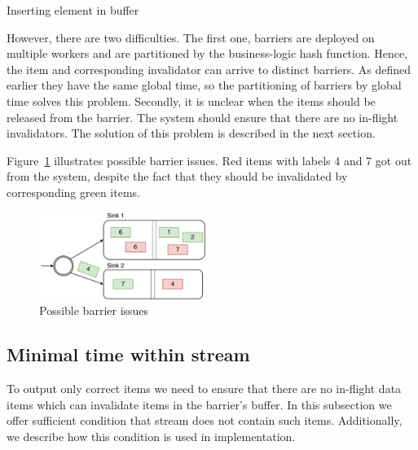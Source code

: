 \begin{algorithm}
\caption{Inserting element in buffer}
\label{buffer-insert}
\begin{algorithmic}
        \State {}
      \EndIf
    \EndFor
    \State {}
  \EndFunction
\end{algorithmic}
\end{algorithm}

However, there are two difficulties. The first one, barriers are deployed on multiple workers and are partitioned by the business-logic hash function. Hence, the item and corresponding invalidator can arrive to distinct barriers. As defined earlier they have the same global time, so the partitioning of barriers by global time solves this problem. Secondly, it is unclear when the items should be released from the barrier. The system should ensure that there are no in-flight invalidators. The solution of this problem is described in the next section. 

Figure~\ref{invalidation-problems-figure} illustrates possible barrier issues. Red items with labels 4 and 7 got out from the system, despite the fact that they should be invalidated by corresponding green items. 

\begin{figure}[htbp]
  \centering
  \includegraphics[width=0.48\textwidth]{pics/invalidation_problems}
  \caption{Possible barrier issues}
  \label {invalidation-problems-figure}
\end{figure}

\subsection{Minimal time within stream}
To output only correct items we need to ensure that there are no in-flight data items which can invalidate items in the barrier's buffer. In this subsection we offer sufficient condition that stream does not contain such items. Additionally, we describe how this condition is used in implementation.

